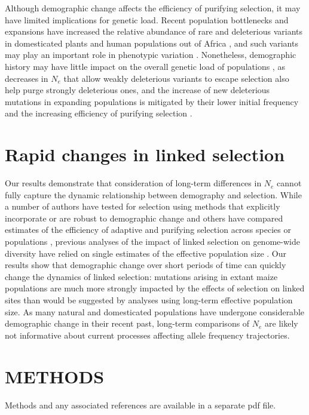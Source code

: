 \documentclass[twoside, twocolumn, letterpaper]{article}
\begin{document}
Although demographic change affects the efficiency of purifying selection, it may have limited implications for genetic load. 
Recent population bottlenecks and expansions have increased the relative abundance of rare and 
deleterious variants in domesticated plants \cite{Gunther:2010gt,renaut2015} and human populations out of Africa \cite{keinan2012,coventry2010}, and such variants may play an important role in phenotypic variation \cite{Mezmouk:2014es, coventry2010, eyre2010}.
Nonetheless, demographic history may have little impact on the overall genetic load of populations \cite{do2015,simons2014}, as decreases in $N_e$ that allow weakly deleterious variants to escape selection also help purge strongly deleterious ones, and the increase of new deleterious mutations in expanding populations is mitigated by their lower initial frequency and the increasing efficiency of purifying selection \cite{gazave2013, simons2014, lohmueller2014}. 

\section*{Rapid changes in linked selection} %
Our results demonstrate that consideration of long-term differences in $N_e$ cannot fully capture the dynamic relationship between demography and selection. 
While a number of authors have tested for selection using methods that explicitly incorporate or are robust to demographic change \cite{eyre2009estimating, chen2010, zeng2010} and others have compared estimates of the efficiency of adaptive and purifying selection across species \cite{popadin2012} or populations \cite{Elyashiv:2010ga}, previous analyses of the impact of linked selection on genome-wide diversity have relied on single estimates of the effective population size \cite{corbett2015,leffler2012}.
Our results show that demographic change over short periods of time can quickly change the dynamics of linked selection: mutations arising in extant maize populations are much more strongly impacted by the effects of selection on linked sites than would be suggested by analyses using long-term effective population size.
As many natural and domesticated populations have undergone considerable demographic change in their recent past, long-term comparisons of $N_e$ are likely not informative about current processes affecting allele frequency trajectories.

\section*{METHODS}
Methods and any associated references are available in a separate pdf file.
\end{document}
